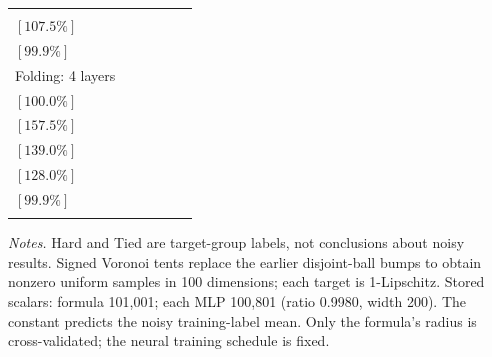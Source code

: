 \begin{table}[t]
\begin{subtable}{\textwidth}
{\begin{tabular}{@{}lccccc@{}}
  \shortstack{$(1.297\pm 0.052)\times10^{-1}$\\$[107.5\%]$} &
  \shortstack{$(1.205\pm 0.046)\times10^{-1}$\\$[99.9\%]$} \\
\addlinespace[3pt]
Folding: 4 layers &
  \shortstack{$(4.109\pm 0.225)\times10^{-2}$\\$[100.0\%]$} &
  \shortstack{$(6.474\pm 0.358)\times10^{-2}$\\$[157.5\%]$} &
  \shortstack{$(5.712\pm 0.352)\times10^{-2}$\\$[139.0\%]$} &
  \shortstack{$(5.260\pm 0.247)\times10^{-2}$\\$[128.0\%]$} &
  \shortstack{$(4.105\pm 0.223)\times10^{-2}$\\$[99.9\%]$} \\
\addlinespace[3pt]
\bottomrule
\end{tabular}%
}
\end{subtable}
\par\smallskip
\begin{minipage}{\textwidth}
\footnotesize
\emph{Notes.} Hard and Tied are target-group labels, not conclusions about noisy results. Signed Voronoi tents replace the earlier disjoint-ball bumps to obtain nonzero uniform samples in 100 dimensions; each target is 1-Lipschitz. Stored scalars: formula 101,001; each MLP 100,801 (ratio 0.9980, width 200). The constant predicts the noisy training-label mean. Only the formula's radius is cross-validated; the neural training schedule is fixed.
\end{minipage}
\end{table}
